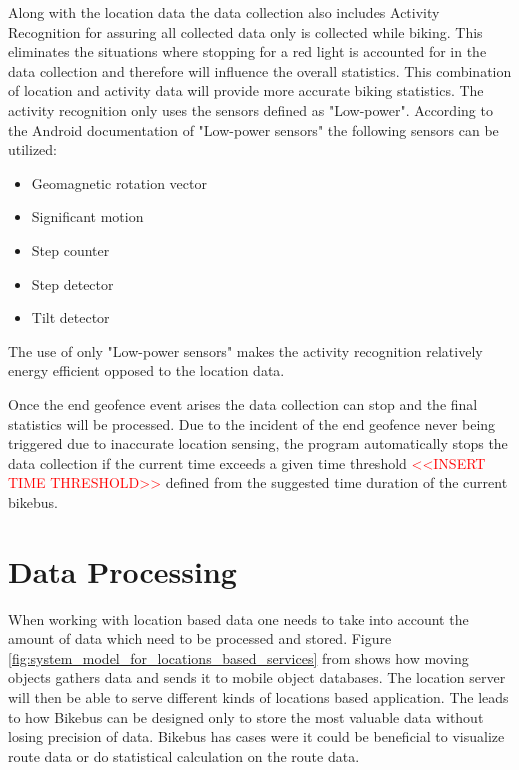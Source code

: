 Along with the location data the data collection also includes Activity Recognition for assuring all collected data only is collected while biking. This eliminates the situations where stopping for a red light is accounted for in the data collection and therefore will influence the overall statistics. This combination of location and activity data will provide more accurate biking statistics. 
The activity recognition only uses the sensors defined as "Low-power".
According to the Android documentation of "Low-power sensors" \cite{androidLow} the following sensors can be utilized:
\begin{itemize}
    \item Geomagnetic rotation vector
    \item Significant motion
    \item Step counter
    \item Step detector
    \item Tilt detector
\end{itemize}
The use of only "Low-power sensors" makes the activity recognition relatively energy efficient opposed to the location data.

Once the end geofence event arises the data collection can stop and the final statistics will be processed. Due to the incident of the end geofence never being triggered due to inaccurate location sensing, the program automatically stops the data collection if the current time exceeds a given time threshold \textcolor{red}{<<INSERT TIME THRESHOLD>>} defined from the suggested time duration of the current bikebus.

\section{Data Processing}
\label{sec:data_processing}

When working with location based data one needs to take into account the amount of data which need to be processed and stored. Figure \ref{fig:system_model_for_locations_based_services} from \cite{Lee2011} shows how moving objects gathers data and sends it to mobile object databases. The location server will then be able to serve different kinds of locations based application. The leads to how Bikebus can be designed only to store the most valuable data without losing precision of data. Bikebus has cases were it could be beneficial to visualize route data or do statistical calculation on the route data.   

